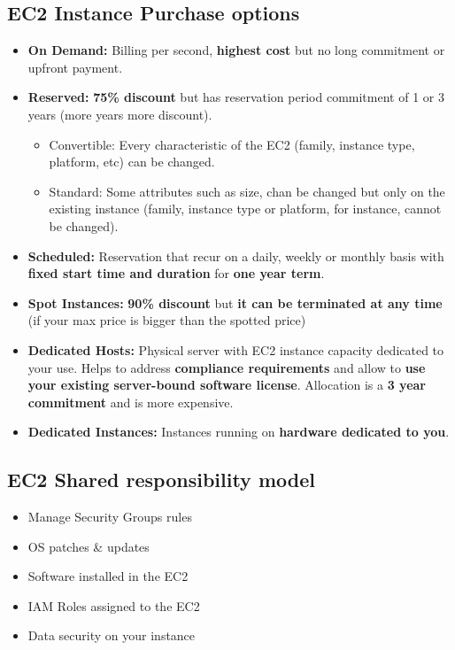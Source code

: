 \subsection{EC2 Instance Purchase options}
\begin{itemize}
	\item \textbf{On Demand:} Billing per second, \textbf{highest cost} but no long commitment or upfront payment.
	\item \textbf{Reserved:} \textbf{75\% discount} but has reservation period commitment of 1 or 3 years (more years more discount).
	\begin{itemize}
		\item {Convertible:} Every characteristic of the EC2 (family, instance type, platform, etc) can be changed.
		\item {Standard:} Some attributes such as size, chan be changed but only on the existing instance (family, instance type or platform, for instance, cannot be changed).
	\end{itemize}
	\item \textbf{Scheduled:} Reservation that recur on a daily, weekly or monthly basis with \textbf{fixed start time and duration} for \textbf{one year term}.
	\item \textbf{Spot Instances:} \textbf{90\% discount} but \textbf{it can be terminated at any time} (if your max price is bigger than the spotted price)
	\item \textbf{Dedicated Hosts:} Physical server with EC2 instance capacity dedicated to your use. Helps to address \textbf{compliance requirements} and allow to \textbf{use your existing server-bound software license}. Allocation is a \textbf{3 year commitment} and is more expensive.
	\item \textbf{Dedicated Instances:} Instances running on \textbf{hardware dedicated to you}.
\end{itemize}

\subsection{EC2 Shared responsibility model}
\begin{itemize}
	\item{Manage Security Groups rules}
	\item{OS patches \& updates}
	\item{Software installed in the EC2}
	\item{IAM Roles assigned to the EC2}
	\item{Data security on your instance}
\end{itemize}
